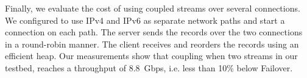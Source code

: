 
Finally, we evaluate the cost of using coupled streams over several \tcp 
connections.
We configured \tcpls to use IPv4 and IPv6 as separate network paths and start a 
\tcp connection on each path. 
The \tcpls server sends the records over the two \tcp connections in a 
round-robin manner. The \tcpls client receives and reorders the records using 
an efficient heap.
Our measurements show that coupling when two streams in our testbed,
\tcpls reaches a throughput of 8.8~Gbps, i.e. less than 10\% below Failover.

